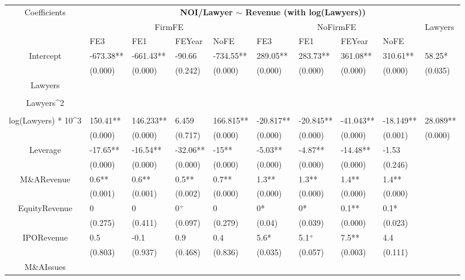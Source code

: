 \documentclass{article}
\begin{document}
\begin{table}[H]
\centering
\begin{tabular}{|clllllllll|}
\hline
\multirow{3}{*}{Coefficients} & \multicolumn{9}{c|}{\textbf{NOI/Lawyer $\sim$ Revenue (with log(Lawyers))}} \\
\cline{2-10}
& \multicolumn{4}{c}{FirmFE} & \multicolumn{4}{c}{NoFirmFE} & \multirow{2}{*}{Lawyers} \\
\cline{2-9}
& FE3 & FE1 & FEYear & NoFE & FE3 & FE1 & FEYear & NoFE &  \\
\hline
 
Intercept & -673.38** & -661.43** & -90.66 & -734.55** & 289.05** & 283.73** & 361.08** & 310.61** & 58.25* \\ 
   & (0.000) & (0.000) & (0.242) & (0.000) & (0.000) & (0.000) & (0.000) & (0.000) & (0.035) \\ 
  Lawyers &  &  &  &  &  &  &  &  &  \\ 
   &  &  &  &  &  &  &  &  &  \\ 
  Lawyers^2 &  &  &  &  &  &  &  &  &  \\ 
   &  &  &  &  &  &  &  &  &  \\ 
  log(Lawyers) * 10^3 & 150.41** & 146.233** & 6.459 & 166.815** & -20.817** & -20.845** & -41.043** & -18.149** & 28.089** \\ 
   & (0.000) & (0.000) & (0.717) & (0.000) & (0.000) & (0.000) & (0.000) & (0.001) & (0.000) \\ 
  Leverage & -17.65** & -16.54** & -32.06** & -15** & -5.03** & -4.87** & -14.48** & -1.53 &  \\ 
   & (0.000) & (0.000) & (0.000) & (0.000) & (0.000) & (0.000) & (0.000) & (0.246) &  \\ 
  M\&ARevenue & 0.6** & 0.6** & 0.5** & 0.7** & 1.3** & 1.3** & 1.4** & 1.4** &  \\ 
   & (0.001) & (0.001) & (0.002) & (0.000) & (0.000) & (0.000) & (0.000) & (0.000) &  \\ 
  EquityRevenue & 0 & 0 & 0$^{+}$ & 0 & 0* & 0* & 0.1** & 0.1* &  \\ 
   & (0.275) & (0.411) & (0.097) & (0.279) & (0.04) & (0.039) & (0.000) & (0.023) &  \\ 
  IPORevenue & 0.5 & -0.1 & 0.9 & 0.4 & 5.6* & 5.1$^{+}$ & 7.5** & 4.4 &  \\ 
   & (0.803) & (0.937) & (0.468) & (0.836) & (0.035) & (0.057) & (0.003) & (0.111) &  \\ 
  M\&AIssues &  &  &  &  &  &  &  &  &  \\ 

\end{tabular}
\end{table}
\end{document}
